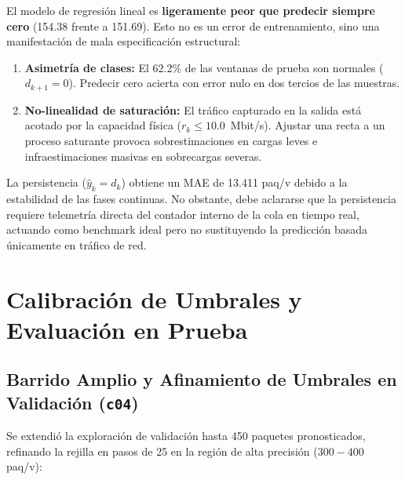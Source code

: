 \documentclass[11pt,a4paper]{article}
\begin{document}
\begin{tcolorbox}[colback=blue!5,colframe=blue!60!black,title=\textbf{Diagnóstico de la Mala Especificación frente a Baselines}]
El modelo de regresión lineal es \textbf{ligeramente peor que predecir siempre cero} (154.38 frente a 151.69). Esto no es un error de entrenamiento, sino una manifestación de mala especificación estructural:
\begin{enumerate}
    \item \textbf{Asimetría de clases:} El 62.2\% de las ventanas de prueba son normales ($d_{k+1} = 0$). Predecir cero acierta con error nulo en dos tercios de las muestras.
    \item \textbf{No-linealidad de saturación:} El tráfico capturado en la salida está acotado por la capacidad física ($r_k \le 10.0$~Mbit/s). Ajustar una recta a un proceso saturante provoca sobrestimaciones en cargas leves e infraestimaciones masivas en sobrecargas severas.
\end{enumerate}
La persistencia ($\hat{y}_k = d_k$) obtiene un MAE de 13.411 paq/v debido a la estabilidad de las fases continuas. No obstante, debe aclararse que la persistencia requiere telemetría directa del contador interno de la cola en tiempo real, actuando como benchmark ideal pero no sustituyendo la predicción basada únicamente en tráfico de red.
\end{tcolorbox}

\section{Calibración de Umbrales y Evaluación en Prueba}

\subsection{Barrido Amplio y Afinamiento de Umbrales en Validación (\texttt{c04})}
Se extendió la exploración de validación hasta 450 paquetes pronosticados, refinando la rejilla en pasos de 25 en la región de alta precisión ($300 - 400$ paq/v):
\end{document}
